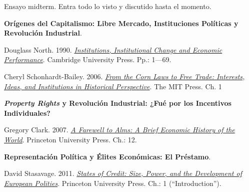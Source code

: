 \documentclass[letterpaper]{article}
\renewenvironment{itemize}{
  \begin{list}{}{
    \setlength{\leftmargin}{1.5em}
  }
}{
  \end{list}
}
\begin{document}
\begin{enumerate}[label=\roman*.]
\begin{itemize}
		\end{itemize}

\item[{\color{red}\Pointinghand}] Ensayo midterm. Entra todo lo visto y discutido hasta el momento.


	\item {}
		\begin{itemize}

			\item[11.] {\bf Or\'igenes del Capitalismo: Libre Mercado, Instituciones Pol\'iticas y Revoluci\'on Industrial}.
				\begin{itemize}
					\item[$\circ$]  Douglass North. 1990. \href{https://github.com/hbahamonde/Ciencia_Politica_II/raw/master/Readings/North.pdf}{\emph{Institutions, Institutional Change and Economic Performance}}. Cambridge University Press. Pp.: 1---69.
          \item[$\circ$] Cheryl Schonhardt-Bailey. 2006. \href{https://github.com/hbahamonde/Ciencia_Politica_II/raw/master/Readings/Corn_Laws.pdf}{\emph{From the Corn Laws to Free Trade: Interests, Ideas, and Institutions in Historical Perspective}}. The MIT Press. Ch. 1
        \end{itemize}


			\item[12.] {\bf \emph{Property Rights} y Revoluci\'on Industrial: ¿Fu\'e por los Incentivos Individuales?}
				\begin{itemize}
					\item[$\circ$]  Gregory Clark. 2007. \href{https://github.com/hbahamonde/Ciencia_Politica_II/raw/master/Readings/Clark.pdf}{\emph{A Farewell to Alms: A Brief Economic History of the World}}. Princeton University Press. Ch.: 12.
				\end{itemize}


			\item[13.] {\bf Representaci\'on Pol\'itica y \'Elites Econ\'omicas: El Pr\'estamo}.
				\begin{itemize}
          \item[$\circ$]  David Stasavage. 2011. \href{https://github.com/hbahamonde/Ciencia_Politica_II/raw/master/Readings/Stasavage.pdf}{\emph{States of Credit: Size, Power, and the Development of European Polities}}. Princeton University Press. Ch.: 1 (``Introduction'').
        \end{itemize}



\end{itemize}
\end{enumerate}
\end{document}
